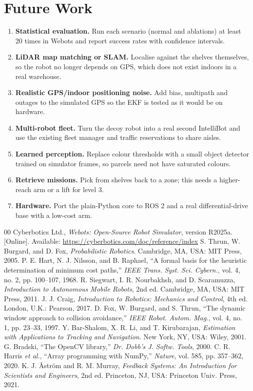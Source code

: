 \documentclass[conference]{IEEEtran}
\begin{document}
\section{Future Work}
\begin{enumerate}
\item \textbf{Statistical evaluation.} Run each scenario (normal and ablations) at least 20 times in Webots and report success rates with confidence intervals.
\item \textbf{LiDAR map matching or SLAM.} Localise against the shelves themselves, so the robot no longer depends on GPS, which does not exist indoors in a real warehouse.
\item \textbf{Realistic GPS/indoor positioning noise.} Add bias, multipath and outages to the simulated GPS so the EKF is tested as it would be on hardware.
\item \textbf{Multi-robot fleet.} Turn the decoy robot into a real second IntelliBot and use the existing fleet manager and traffic reservations to share aisles.
\item \textbf{Learned perception.} Replace colour thresholds with a small object detector trained on simulator frames, so parcels need not have saturated colours.
\item \textbf{Retrieve missions.} Pick from shelves back to a zone; this needs a higher-reach arm or a lift for level 3.
\item \textbf{Hardware.} Port the plain-Python core to ROS 2 and a real differential-drive base with a low-cost arm.
\end{enumerate}
\begin{thebibliography}{00}
 Cyberbotics Ltd., \textit{Webots: Open-Source Robot Simulator}, version R2025a. [Online]. Available: \url{https://cyberbotics.com/doc/reference/index}
 S. Thrun, W. Burgard, and D. Fox, \textit{Probabilistic Robotics}. Cambridge, MA, USA: MIT Press, 2005.
 P. E. Hart, N. J. Nilsson, and B. Raphael, ``A formal basis for the heuristic determination of minimum cost paths,'' \textit{IEEE Trans. Syst. Sci. Cybern.}, vol. 4, no. 2, pp. 100--107, 1968.
 R. Siegwart, I. R. Nourbakhsh, and D. Scaramuzza, \textit{Introduction to Autonomous Mobile Robots}, 2nd ed. Cambridge, MA, USA: MIT Press, 2011.
 J. J. Craig, \textit{Introduction to Robotics: Mechanics and Control}, 4th ed. London, U.K.: Pearson, 2017.
 D. Fox, W. Burgard, and S. Thrun, ``The dynamic window approach to collision avoidance,'' \textit{IEEE Robot. Autom. Mag.}, vol. 4, no. 1, pp. 23--33, 1997.
 Y. Bar-Shalom, X. R. Li, and T. Kirubarajan, \textit{Estimation with Applications to Tracking and Navigation}. New York, NY, USA: Wiley, 2001.
 G. Bradski, ``The OpenCV library,'' \textit{Dr. Dobb's J. Softw. Tools}, 2000.
 C. R. Harris \textit{et al.}, ``Array programming with NumPy,'' \textit{Nature}, vol. 585, pp. 357--362, 2020.
 K. J. \AA{}str\"om and R. M. Murray, \textit{Feedback Systems: An Introduction for Scientists and Engineers}, 2nd ed. Princeton, NJ, USA: Princeton Univ. Press, 2021.
\end{thebibliography}
\end{document}
